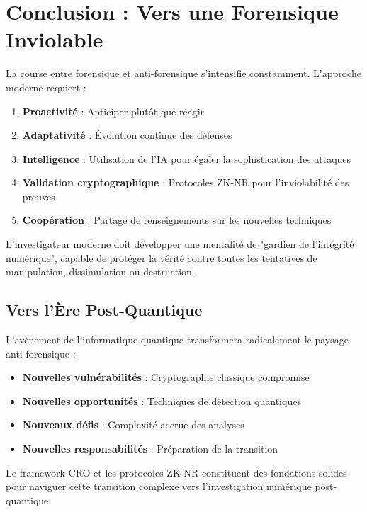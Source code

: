 \section{Conclusion : Vers une Forensique Inviolable}

La course entre forensique et anti-forensique s'intensifie constamment. L'approche moderne requiert :

\begin{enumerate}
\item \textbf{Proactivité} : Anticiper plutôt que réagir
\item \textbf{Adaptativité} : Évolution continue des défenses
\item \textbf{Intelligence} : Utilisation de l'IA pour égaler la sophistication des attaques
\item \textbf{Validation cryptographique} : Protocoles ZK-NR pour l'inviolabilité des preuves
\item \textbf{Coopération} : Partage de renseignements sur les nouvelles techniques
\end{enumerate}

L'investigateur moderne doit développer une mentalité de "gardien de l'intégrité numérique", capable de protéger la vérité contre toutes les tentatives de manipulation, dissimulation ou destruction.

\subsection{Vers l'Ère Post-Quantique}

L'avènement de l'informatique quantique transformera radicalement le paysage anti-forensique :

\begin{itemize}
\item \textbf{Nouvelles vulnérabilités} : Cryptographie classique compromise
\item \textbf{Nouvelles opportunités} : Techniques de détection quantiques
\item \textbf{Nouveaux défis} : Complexité accrue des analyses
\item \textbf{Nouvelles responsabilités} : Préparation de la transition
\end{itemize}

Le framework CRO et les protocoles ZK-NR constituent des fondations solides pour naviguer cette transition complexe vers l'investigation numérique post-quantique.